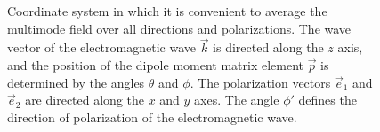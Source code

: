 \begin{figure}
\centering



\caption{Coordinate system in which it is convenient to average
  the multimode field over all directions and polarizations. The wave
  vector of the electromagnetic wave $\vec{k}$ is directed along the $z$ axis, 
  and the position of the dipole moment matrix element $\vec{p}$
  is determined by the angles $\theta$ and $\phi$. The polarization vectors $\vec{e}_1$ and $\vec{e}_2$ 
are directed along the $x$ and $y$ axes. The angle $\phi'$ defines the direction 
of polarization of the electromagnetic wave.}
\label{figPart1Ch2_6}
\end{figure}